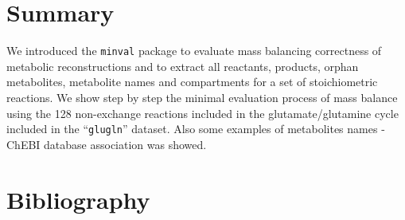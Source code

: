 \section{Summary}
We introduced the \texttt{minval} package to evaluate mass balancing correctness of metabolic reconstructions and to extract all reactants, products, orphan metabolites, metabolite names and compartments for a set of stoichiometric reactions. We show step by step the minimal evaluation process of mass balance using the 128 non-exchange reactions included in the glutamate/glutamine cycle included in the ``\texttt{glugln}'' dataset. Also some examples of metabolites names - ChEBI database association was showed.

\section{Bibliography}